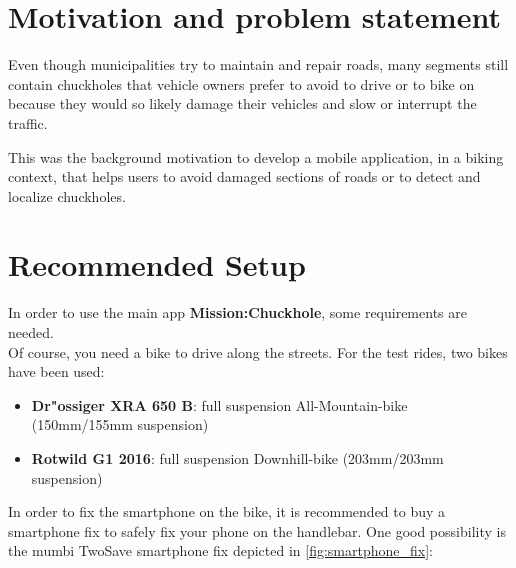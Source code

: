 \documentclass[10pt,a4paper]{article} %
\begin{document}
    \pagestyle{plain}
    \title{\rmfamily\normalfont{}}
    \author{}
    \date{} %
    
    \maketitle
    

    \tableofcontents
    


    \section{Motivation and problem statement}

	

Even though municipalities try to maintain and repair roads, many segments still contain chuckholes that vehicle owners prefer to avoid to drive or to bike on because they would so likely damage their vehicles and slow or interrupt the traffic.

This was the background motivation to develop a mobile application, in a biking context, that helps users to avoid damaged sections of roads or to detect and localize chuckholes.

 
 
 
 
    \section{Recommended Setup}

	In order to use the main app \textbf{Mission:Chuckhole}, some requirements are needed.\\
	Of course, you need a bike to drive along the streets.
	For the test rides, two bikes have been used:

	\begin{itemize}
		\item \textbf{Dr"ossiger XRA 650 B}: full suspension All-Mountain-bike (150mm/155mm suspension)
		\item \textbf{Rotwild G1 2016}: full suspension Downhill-bike (203mm/203mm suspension)
	\end{itemize}


	In order to fix the smartphone on the bike, it is recommended to buy a smartphone fix to safely fix your phone on the handlebar.
	One good possibility is the mumbi TwoSave smartphone fix depicted in \autoref{fig:smartphone_fix}:
\end{document}
